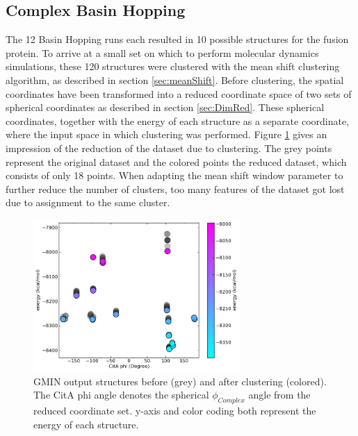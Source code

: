 \documentclass[english, a4paper, 12pt, titlepage, draft]{article}
\begin{document}
\subsection{Complex Basin Hopping}

The 12 Basin Hopping runs each resulted in 10 possible structures for the fusion protein.
To arrive at a small set on which to perform molecular dynamics simulations, these 120 structures were clustered with the mean shift clustering algorithm, as described in section \ref{sec:meanShift}.
Before clustering, the spatial coordinates have been transformed into a reduced coordinate space of two sets of spherical coordinates as described in section \ref{sec:DimRed}.
These spherical coordinates, together with the energy of each structure as a separate coordinate, where the input space in which clustering was performed.
Figure \ref{fig:GMIN_CitA_phi} gives an impression of the reduction of the dataset due to clustering.
The grey points represent the original dataset and the colored points the reduced dataset, which consists of only 18 points.
When adapting the mean shift window parameter to further reduce the number of clusters, too many features of the dataset got lost due to assignment to the same cluster.


\begin{figure}
    \centering
    \includegraphics[width=0.7\textwidth]{figures/CitA_phi.png}
    \caption{GMIN output structures before (grey) and after clustering (colored).
        The CitA phi angle denotes the spherical $\phi_{Complex}$ angle from the reduced coordinate set.
        y-axis and color coding both represent the energy of each structure.}
    \label{fig:GMIN_CitA_phi}
\end{figure}        
\end{document}
